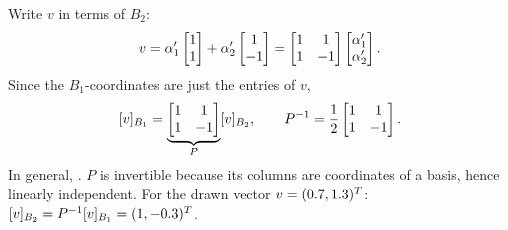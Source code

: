 \begin{insight}
Write $v$ in terms of $B_2$:
\[ v=\alpha_1'\begin{bmatrix}1\\1\end{bmatrix}+\alpha_2'\begin{bmatrix}1\\-1\end{bmatrix}=\begin{bmatrix}1&1\\1&-1\end{bmatrix}\begin{bmatrix}\alpha_1'\\\alpha_2'\end{bmatrix}. \]
Since the $B_1$-coordinates are just the entries of $v$,
\[
[v]_{B_1}=\underbrace{\begin{bmatrix}1&1\\1&-1\end{bmatrix}}_{P}[v]_{B_2},
\qquad
P^{-1}=\frac12\begin{bmatrix}1&1\\1&-1\end{bmatrix}.
\]
In general, . $P$ is invertible because its columns are coordinates of a basis, hence linearly independent. For the drawn vector $v=(0.7,1.3)^{T}$: $[v]_{B_2}=P^{-1}[v]_{B_1}=(1,-0.3)^{T}$.
\end{insight}

